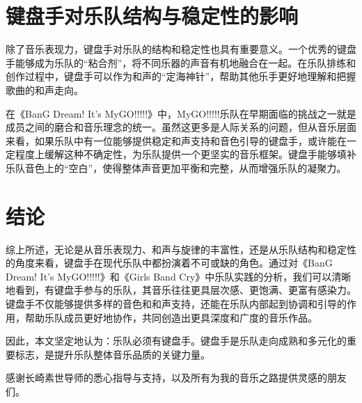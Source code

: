 \documentclass{pkuthesis}
\begin{document}
\section{键盘手对乐队结构与稳定性的影响}
除了音乐表现力，键盘手对乐队的结构和稳定性也具有重要意义。一个优秀的键盘手能够成为乐队的“粘合剂”，将不同乐器的声音有机地融合在一起。在乐队排练和创作过程中，键盘手可以作为和声的“定海神针”，帮助其他乐手更好地理解和把握歌曲的和声走向。

在《BanG Dream! It's MyGO!!!!!》中，MyGO!!!!!乐队在早期面临的挑战之一就是成员之间的磨合和音乐理念的统一。虽然这更多是人际关系的问题，但从音乐层面来看，如果乐队中有一位能够提供稳定和声支持和音色引导的键盘手，或许能在一定程度上缓解这种不确定性，为乐队提供一个更坚实的音乐框架。键盘手能够填补乐队音色上的“空白”，使得整体声音更加平衡和完整，从而增强乐队的凝聚力。

\section{结论}
综上所述，无论是从音乐表现力、和声与旋律的丰富性，还是从乐队结构和稳定性的角度来看，键盘手在现代乐队中都扮演着不可或缺的角色。通过对《BanG Dream! It's MyGO!!!!!》和《Girls Band Cry》中乐队实践的分析，我们可以清晰地看到，有键盘手参与的乐队，其音乐往往更具层次感、更饱满、更富有感染力。键盘手不仅能够提供多样的音色和和声支持，还能在乐队内部起到协调和引导的作用，帮助乐队成员更好地协作，共同创造出更具深度和广度的音乐作品。

因此，本文坚定地认为：乐队必须有键盘手。键盘手是乐队走向成熟和多元化的重要标志，是提升乐队整体音乐品质的关键力量。

\printbibliography
\acknowledgments
感谢长崎素世导师的悉心指导与支持，以及所有为我的音乐之路提供灵感的朋友们。
\end{document}
